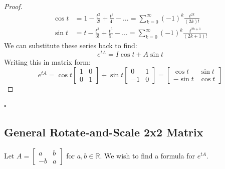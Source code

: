 \documentclass[12pt,a4paper]{report}
\theoremstyle{definition}
\numberwithin{equation}{chapter}
\begin{document}
\begin{proof}
\begin{align}
\cos t &= 1 - \frac{t^2}{2!} + \frac{t^4}{4!} - \dots = \sum_{k=0}^\infty (-1)^k \frac{t^{2k}}{(2k)!} \\
\sin t &= t - \frac{t^3}{3!} + \frac{t^5}{5!} - \dots = \sum_{k=0}^\infty (-1)^k \frac{t^{2k+1}}{(2k+1)!}
\end{align}
We can substitute these series back to find:
\begin{equation}
e^{tA} = I \cos t + A \sin t
\end{equation}
Writing this in matrix form:
\begin{equation}
e^{tA} = \cos t \begin{bmatrix} 1 & 0 \\ 0 & 1 \end{bmatrix} + \sin t \begin{bmatrix} 0 & 1 \\ -1 & 0 \end{bmatrix} = \begin{bmatrix} \cos t & \sin t \\ -\sin t & \cos t \end{bmatrix}
\end{equation}
\end{proof}
\hfill $\square$

\subsection{General Rotate-and-Scale 2x2 Matrix}
Let $A = \begin{bmatrix} a & b \\ -b & a \end{bmatrix}$ for $a, b \in \mathbb{R}$. We wish to find a formula for $e^{tA}$.
\end{document}
